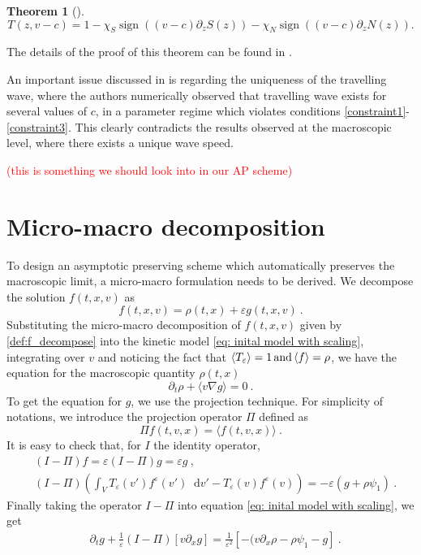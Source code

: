 \documentclass[11pt,twoside]{article}
\theoremstyle{nonumberplain}
\DeclareMathOperator{\sign}{sign}
\newcommand*\diff{\mathop{}\!\mathrm{d}}
\newtheorem{theorem}{Theorem}%
\begin{document}
\begin{theorem}[\cite{calvez2016chemotactic}]
\[
    T(z, v-c) = 1 - \chi_S \sign((v-c)\partial_zS(z)) - \chi_N \sign((v-c)\partial_zN(z)) .
\]

\end{theorem}

The details of the proof of this theorem can be found in \cite{calvez2016chemotactic}.

\noindent An important issue discussed in \cite{calvez2018well} is regarding the uniqueness of the travelling wave, where the authors numerically observed that travelling wave exists for several values of $c$, in a parameter regime which violates conditions \eqref{constraint1}-\eqref{constraint3}. This clearly contradicts the results observed at the macroscopic level, where there exists a unique wave speed.  

\textcolor{red}{(this is something we should look into in our AP scheme)}







\section{Micro-macro decomposition}

To design an asymptotic preserving scheme which automatically preserves the macroscopic limit, a micro-macro formulation needs to be derived. 
We decompose the solution $f(t,x,v)$ as 
\begin{equation}\label{def:f_decompose}
    f(t,x,v) = \rho(t,x) + \varepsilon g(t,x,v)\ .
\end{equation}
Substituting the micro-macro decomposition of $f(t, x, v)$ given by \eqref{def:f_decompose} into the  kinetic model \eqref{eq: inital model with scaling}, integrating over $v$ and noticing the fact that $\langle T_\varepsilon \rangle=1 \, \textnormal{and}\, \langle f\rangle = \rho$, we have the equation for the macroscopic quantity $\rho(t, x)$
\begin{equation*}
    \partial_t \rho +  \langle v \nabla  g\rangle  =  0\ .
\end{equation*}
To get the equation for $g$, we use the projection technique. 
For simplicity of notations, we introduce the projection operator $\Pi$ defined as 
\begin{equation*}
    \Pi f(t,{v},{x}) = \langle f(t,{v},{x})\rangle \ .
\end{equation*}
It is easy to check that, {for $I$ the identity operator,} 
\begin{align*}
    & (I - \Pi) f = \varepsilon(I - \Pi) g = \varepsilon g\ ,\\
    & (I - \Pi) \left(\int_VT_\varepsilon(v')f^\varepsilon(v')\diff v'-T_\varepsilon(v)f^\varepsilon(v)\right) = -\varepsilon\left(g+\rho \psi_1 \right) \ .
\end{align*}
Finally taking the operator $I-\Pi$ into equation \eqref{eq: inital model with scaling}, we get
\begin{align*}
    &\partial_t g + \frac{1}{\varepsilon} (I-\Pi)\left[v \partial_x g \right] 
    = \frac{1}{\varepsilon^2}\left[-(v\partial_x\rho-\rho \psi_1  - g\right] \ .
\end{align*}
\end{document}
